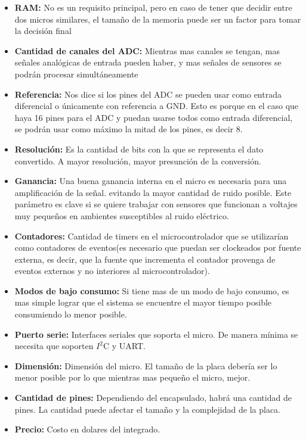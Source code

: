 \begin{itemize}
  \item \textbf{RAM:} No es un requisito principal, pero en caso de tener que decidir entre dos micros similares, el tamaño de la memoria puede ser un factor para tomar la decisión final
  \item \textbf{Cantidad de canales del ADC:} Mientras mas canales se tengan, mas señales analógicas de entrada pueden haber, y mas señales de sensores se podrán procesar simultáneamente
  \item \textbf{Referencia:} Nos dice si los pines del ADC se pueden usar como entrada diferencial o únicamente con referencia a GND. Esto es porque en el caso que haya 16 pines para el ADC y puedan usarse todos como entrada diferencial, se podrán usar como máximo la mitad de los pines, es decir 8.
  \item \textbf{Resolución:} Es la cantidad de bits con la que se representa el dato convertido. A mayor resolución, mayor presunción de la conversión.
  \item \textbf{Ganancia:} Una buena ganancia interna en el micro es necesaria para una amplificación de la señal.  evitando la mayor cantidad de ruido posible. Este parámetro es clave si se quiere trabajar con sensores que funcionan a voltajes muy pequeños en ambientes susceptibles al ruido eléctrico.
  \item \textbf{Contadores:} Cantidad de timers en el microcontrolador que se utilizarían como contadores de eventos(es necesario que puedan ser clockeados por fuente externa, es decir, que la fuente que incrementa el contador provenga de eventos externos y no interiores al microcontrolador).
  \item \textbf{Modos de bajo consumo:} Si tiene mas de un modo de bajo consumo, es mas simple lograr que el sistema se encuentre el mayor tiempo posible consumiendo lo menor posible.
  \item \textbf{Puerto serie:} Interfaces seriales que soporta el micro. De manera mínima se necesita que soporten $I^{2}$C y UART.
  \item \textbf{Dimensión:} Dimensión del micro. El tamaño de la placa debería ser lo menor posible por lo que mientras mas pequeño el micro, mejor.
  \item \textbf{Cantidad de pines:} Dependiendo del encapsulado, habrá una cantidad de pines. La cantidad puede afectar el tamaño y la complejidad de la placa.
  \item \textbf{Precio:} Costo en dolares del integrado.
\end{itemize}


